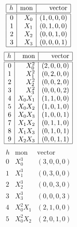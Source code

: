 \begin{table}
\begin{tcolorbox}[tabularx={X|p{2cm}|X|},enhanced,fonttitle=\bfseries\large,fontupper=\normalsize\sffamily,
colback=yellow!10!white,colframe=green!50!black,colbacktitle=blue!30!white,
coltitle=black,title=Monomial Ordering of Partition Type in Three-Space]
\begin{tcbitemize}[raster columns=3,raster equal height,
  colframe=red!75!black,colback=red!5!white,fonttitle=\bfseries]
\tcbitem[squeezed title*={Degree 1}] 
$$
\begin{array}{|r|r|r|}
\hline
h &  \mbox{mon} & \mbox{vector} \\
\hline
\hline
0 & X_0 & ( 1, 0, 0, 0 )\\
1 & X_1 & ( 0, 1, 0, 0 )\\
2 & X_2 & ( 0, 0, 1, 0 )\\
3 & X_3 & ( 0, 0, 0, 1 )\\
\hline
\end{array}
$$
\tcbitem[squeezed title*={Degree 2}] 
$$
\begin{array}{|r|r|r|}
\hline
h &  \mbox{mon} & \mbox{vector} \\
\hline
\hline
0 & X_0^2 & ( 2, 0, 0, 0 )\\
1 & X_1^2 & ( 0, 2, 0, 0 )\\
2 & X_2^2 & ( 0, 0, 2, 0 )\\
3 & X_3^2 & ( 0, 0, 0, 2 )\\
4 & X_0X_1 & ( 1, 1, 0, 0 )\\
5 & X_0X_2 & ( 1, 0, 1, 0 )\\
6 & X_0X_3 & ( 1, 0, 0, 1 )\\
7 & X_1X_2 & ( 0, 1, 1, 0 )\\
8 & X_1X_3 & ( 0, 1, 0, 1 )\\
9 & X_2X_3 & ( 0, 0, 1, 1 )\\
\hline
\end{array}
$$
\tcbitem[squeezed title*={Degree 3}] 
$$
\begin{array}{|r|r|r|}
\hline
h &  \mbox{mon} & \mbox{vector} \\
\hline
\hline
0 & X_0^3 & ( 3, 0, 0, 0 )\\
1 & X_1^3 & ( 0, 3, 0, 0 )\\
2 & X_2^3 & ( 0, 0, 3, 0 )\\
3 & X_3^3 & ( 0, 0, 0, 3 )\\
4 & X_0^2X_1 & ( 2, 1, 0, 0 )\\
5 & X_0^2X_2 & ( 2, 0, 1, 0 )\\

\end{array}$$
\end{tcbitemize}
\end{tcolorbox}
\end{table}
